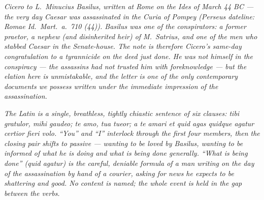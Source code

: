 
\textit{Cicero to L.~Minucius Basilus, written at Rome on the Ides of
March 44 BC --- the very day Caesar was assassinated in the Curia of
Pompey (Perseus dateline: \textit{Romae Id.~Mart.~a.~710 (44)}).
Basilus was one of the conspirators: a former praetor, a nephew (and
disinherited heir) of M.~Satrius, and one of the men who stabbed
Caesar in the Senate-house. The note is therefore Cicero's
same-day congratulation to a tyrannicide on the deed just done. He
was not himself in the conspiracy --- the assassins had not trusted
him with foreknowledge --- but the elation here is unmistakable, and
the letter is one of the only contemporary documents we possess
written under the immediate impression of the assassination.}

\textit{The Latin is a single, breathless, tightly chiastic sentence
of six clauses: \textit{tibi gratulor, mihi gaudeo; te amo, tua
tueor; a te amari et quid agas quidque agatur certior fieri volo}.
``You'' and ``I'' interlock through the first four members, then
the closing pair shifts to passive --- wanting to be loved by Basilus,
wanting to be informed of what he is doing and what is being done
generally. ``What is being done'' (\textit{quid agatur}) is the
careful, deniable formula of a man writing on the day of the
assassination by hand of a courier, asking for news he expects to
be shattering and good. No content is named; the whole event is
held in the gap between the verbs.}

